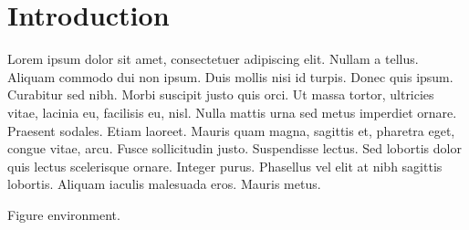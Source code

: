 \chapter{Introduction}
Lorem ipsum dolor sit amet, consectetuer adipiscing elit.
Nullam a tellus. Aliquam commodo dui non ipsum. Duis mollis nisi id turpis.
Donec quis ipsum. Curabitur sed nibh. Morbi suscipit justo quis orci. Ut massa
tortor, ultricies vitae, lacinia eu, facilisis eu, nisl. Nulla mattis urna sed
metus imperdiet ornare. Praesent sodales. Etiam laoreet. Mauris quam magna,
sagittis et, pharetra eget, congue vitae, arcu. Fusce sollicitudin justo.
Suspendisse lectus. Sed lobortis dolor quis lectus scelerisque ornare. Integer
purus. Phasellus vel elit at nibh sagittis lobortis. Aliquam iaculis malesuada
eros. Mauris metus.

Figure environment.
